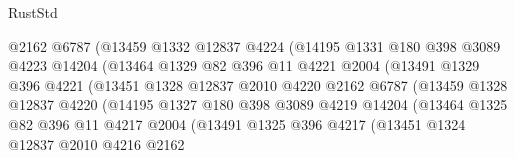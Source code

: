 \begin{lexlean}{RustStd}
\begin{coremodule}
{\begin{coremodule}
{{{{{{{{{{{{{{{{{{{{{{{{{{{{{{{                            @2162
                            @6787
                            (@13459
                              @1332
                              @12837
                              @4224
                              (@14195
                                @1331
                                @180
                                @398
                                @3089
                                @4223
                                @14204
                                (@13464
                                  @1329
                                  @82
                                  @396
                                  @11
                                  @4221
                                  @2004
                                  (@13491
                                    @1329
                                    @396
                                    @4221
                                    (@13451
                                      @1328
                                      @12837
                                      @2010
                                      @4220
                                      @2162
                                      @6787
                                      (@13459
                                        @1328
                                        @12837
                                        @4220
                                        (@14195
                                          @1327
                                          @180
                                          @398
                                          @3089
                                          @4219
                                          @14204
                                          (@13464
                                            @1325
                                            @82
                                            @396
                                            @11
                                            @4217
                                            @2004
                                            (@13491
                                              @1325
                                              @396
                                              @4217
                                              (@13451
                                                @1324
                                                @12837
                                                @2010
                                                @4216
                                                @2162
}}}}}}}}}}}}}}}}}}}}}}}}}}}}}}}
\end{coremodule}}
\end{coremodule}
\end{lexlean}
